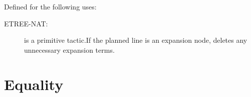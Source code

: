 \begin{description}
\begin{description}
\end{description}

\item[UNNEC-EXP-TAC]  Defined for the following uses:
\begin{description}
\item[ETREE-NAT:]  is a primitive tactic.If the planned line is an expansion node, deletes any unnecessary
expansion terms.

\end{description}

\item
\end{description}

\section{Equality}

